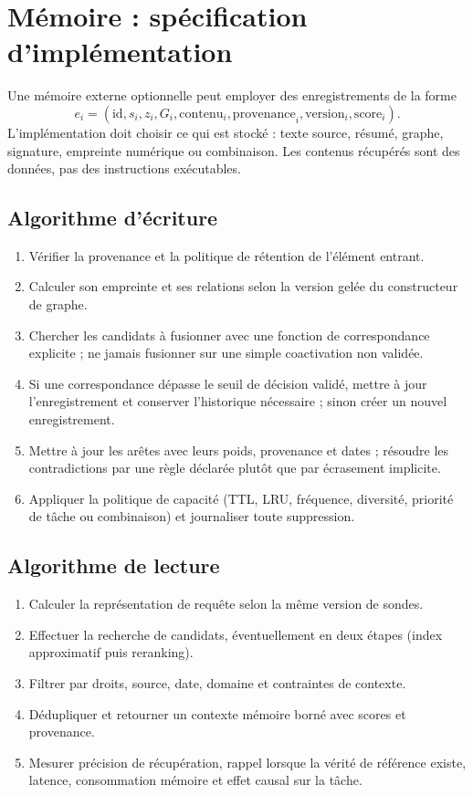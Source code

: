 \documentclass[11pt,a4paper]{article}
\theoremstyle{remark}
\begin{document}
\section{Mémoire : spécification d'implémentation}

Une mémoire externe optionnelle peut employer des enregistrements de la forme
\[
e_i=(\text{id},s_i,z_i,G_i,\text{contenu}_i,\text{provenance}_i,\text{version}_i,\text{score}_i).
\]
L'implémentation doit choisir ce qui est stocké : texte source, résumé, graphe, signature, empreinte numérique ou combinaison. Les contenus récupérés sont des données, pas des instructions exécutables.

\subsection{Algorithme d'écriture}
\begin{enumerate}[label=\textbf{M\arabic*.}]
  \item Vérifier la provenance et la politique de rétention de l'élément entrant.
  \item Calculer son empreinte et ses relations selon la version gelée du constructeur de graphe.
  \item Chercher les candidats à fusionner avec une fonction de correspondance explicite ; ne jamais fusionner sur une simple coactivation non validée.
  \item Si une correspondance dépasse le seuil de décision validé, mettre à jour l'enregistrement et conserver l'historique nécessaire ; sinon créer un nouvel enregistrement.
  \item Mettre à jour les arêtes avec leurs poids, provenance et dates ; résoudre les contradictions par une règle déclarée plutôt que par écrasement implicite.
  \item Appliquer la politique de capacité (TTL, LRU, fréquence, diversité, priorité de tâche ou combinaison) et journaliser toute suppression.
\end{enumerate}

\subsection{Algorithme de lecture}
\begin{enumerate}[label=\textbf{R\arabic*.}]
  \item Calculer la représentation de requête selon la même version de sondes.
  \item Effectuer la recherche de candidats, éventuellement en deux étapes (index approximatif puis reranking).
  \item Filtrer par droits, source, date, domaine et contraintes de contexte.
  \item Dédupliquer et retourner un contexte mémoire borné avec scores et provenance.
  \item Mesurer précision de récupération, rappel lorsque la vérité de référence existe, latence, consommation mémoire et effet causal sur la tâche.
\end{enumerate}
\end{document}
